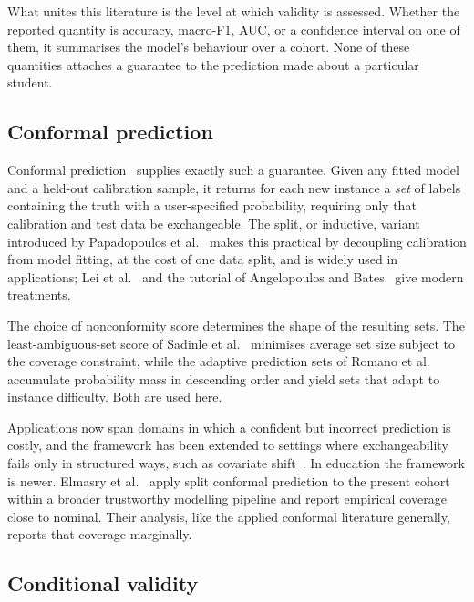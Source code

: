 What unites this literature is the level at which validity is assessed.
Whether the reported quantity is accuracy, macro-F1, AUC, or a confidence
interval on one of them, it summarises the model's behaviour over a cohort.
None of these quantities attaches a guarantee to the prediction made about a
particular student.

\subsection{Conformal prediction}

Conformal prediction~\cite{vovk2005,shafer2008} supplies exactly such a
guarantee. Given any fitted model and a held-out calibration sample, it returns
for each new instance a \emph{set} of labels containing the truth with a
user-specified probability, requiring only that calibration and test data be
exchangeable. The split, or inductive, variant introduced by Papadopoulos et
al.~\cite{papadopoulos2002} makes this practical by decoupling calibration from
model fitting, at the cost of one data split, and is widely used in applications; Lei et al.~\cite{lei2018} and the tutorial of
Angelopoulos and Bates~\cite{angelopoulos2023} give modern treatments.

The choice of nonconformity score determines the shape of the resulting sets.
The least-ambiguous-set score of Sadinle et al.~\cite{sadinle2019} minimises
average set size subject to the coverage constraint, while the adaptive
prediction sets of Romano et al.~\cite{romano2020} accumulate probability mass
in descending order and yield sets that adapt to instance difficulty. Both are
used here.

Applications now span domains in which a confident but incorrect prediction is
costly, and the framework has been extended to settings where exchangeability
fails only in structured ways, such as covariate shift~\cite{tibshirani2019}.
In education the framework is newer. Elmasry et al.~\cite{elmasry2026} apply
split conformal prediction to the present cohort within a broader trustworthy
modelling pipeline and report empirical coverage close to nominal. Their
analysis, like the applied conformal literature generally, reports that
coverage marginally.

\subsection{Conditional validity}

